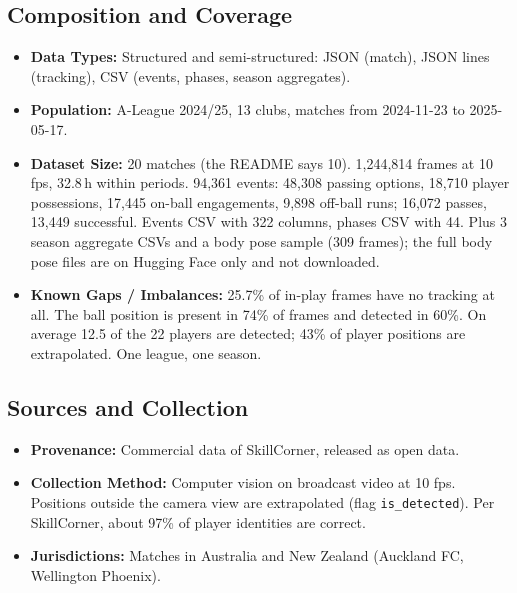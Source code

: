 \documentclass[11pt, a4paper]{article}
\begin{document}
\subsection{Composition and Coverage}
\begin{itemize}
    \item \textbf{Data Types:} Structured and semi-structured: JSON (match), JSON lines (tracking), CSV (events, phases, season aggregates).
    \item \textbf{Population:} A-League 2024/25, 13 clubs, matches from 2024-11-23 to 2025-05-17.
    \item \textbf{Dataset Size:} 20 matches (the README says 10). 1,244,814 frames at 10 fps, 32.8\,h within periods. 94,361 events: 48,308 passing options, 18,710 player possessions, 17,445 on-ball engagements, 9,898 off-ball runs; 16,072 passes, 13,449 successful. Events CSV with 322 columns, phases CSV with 44. Plus 3 season aggregate CSVs and a body pose sample (309 frames); the full body pose files are on Hugging Face only and not downloaded.
    \item \textbf{Known Gaps / Imbalances:} 25.7\% of in-play frames have no tracking at all. The ball position is present in 74\% of frames and detected in 60\%. On average 12.5 of the 22 players are detected; 43\% of player positions are extrapolated. One league, one season.
\end{itemize}

\subsection{Sources and Collection}
\begin{itemize}
    \item \textbf{Provenance:} Commercial data of SkillCorner, released as open data.
    \item \textbf{Collection Method:} Computer vision on broadcast video at 10 fps. Positions outside the camera view are extrapolated (flag \texttt{is\_detected}). Per SkillCorner, about 97\% of player identities are correct.
    \item \textbf{Jurisdictions:} Matches in Australia and New Zealand (Auckland FC, Wellington Phoenix).
\end{itemize}
\end{document}
